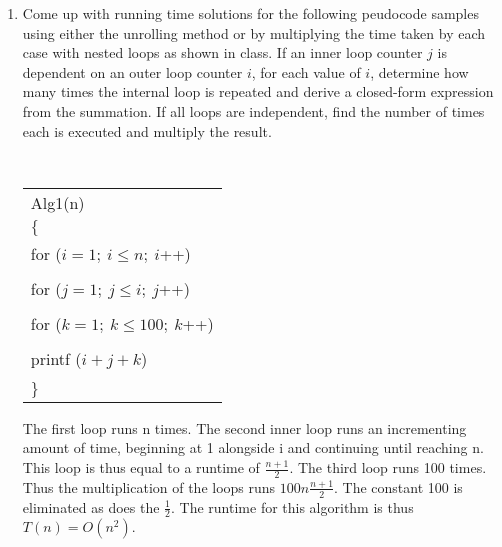 \documentclass[10pt]{article}
\begin{document}
\begin{enumerate}
\newpage
\item Come up with running time solutions for the following peudocode samples using either the unrolling method or by multiplying the time taken by each case with nested loops as shown in class.  If an inner
loop counter $j$ is dependent on an outer loop counter $i$, for each value of $i$, determine how many times the internal loop is repeated and derive a closed-form expression from the summation. If all loops are independent, find the number of times each is
executed and multiply the result.
\\

\vspace{5mm}

{\tt
\begin{tabular} {l}
Alg1(n) \\
  $\{$  \\
     \hspace{5mm}for ($i = 1;\ i \leq n;\ i$++)  \\ \\
     \hspace{10mm}for ($j=1;\ j \leq i;\ j$++)\\ \\
     \hspace{15mm}for ($k=1;\ k \leq 100;\ k$++)\\ \\
     \hspace{20mm}printf ($i + j + k$)\\ \\
  $\}$ \\

\end{tabular}
}

The first loop runs n times. The second inner loop runs an incrementing amount of time, beginning at 1 alongside i and continuing until reaching n. This loop is thus equal to a runtime of $\frac{n + 1}{2}$. The third loop runs 100 times. Thus the multiplication of the loops runs $100n\frac{n+1}{2}$. The constant 100 is eliminated as does the $\frac{1}{2}$. The runtime for this algorithm is thus $T(n) = O(n^2)$.



\vspace{1in}


\end{enumerate}
\end{document}
